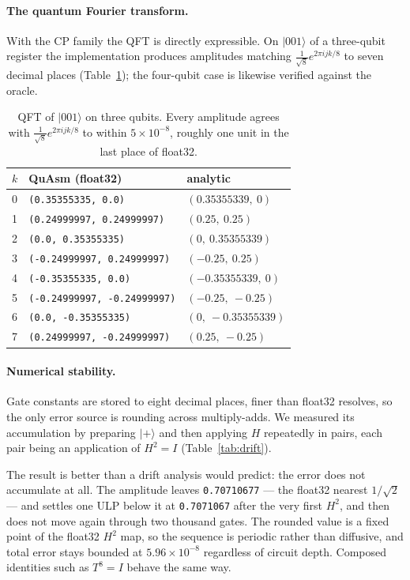 \documentclass[11pt]{article}
\newcommand{\quasm}{QuAsm}
\newcommand{\ket}[1]{\ensuremath{|#1\rangle}}
\begin{document}
\paragraph{The quantum Fourier transform.} With the $\mathrm{CP}$ family the QFT is directly
expressible. On $\ket{001}$ of a three-qubit register the implementation produces
amplitudes matching $\frac{1}{\sqrt{8}} e^{2\pi i jk/8}$ to seven decimal places
(Table~\ref{tab:qft}); the four-qubit case is likewise verified against the oracle.

\begin{table}[t]
\centering
\begin{tabular}{lll}
\toprule
$k$ & \quasm{} (float32) & analytic \\
\midrule
0 & \texttt{(0.35355335, 0.0)}          & $(0.35355339,\ 0)$ \\
1 & \texttt{(0.24999997, 0.24999997)}   & $(0.25,\ 0.25)$ \\
2 & \texttt{(0.0, 0.35355335)}          & $(0,\ 0.35355339)$ \\
3 & \texttt{(-0.24999997, 0.24999997)}  & $(-0.25,\ 0.25)$ \\
4 & \texttt{(-0.35355335, 0.0)}         & $(-0.35355339,\ 0)$ \\
5 & \texttt{(-0.24999997, -0.24999997)} & $(-0.25,\ -0.25)$ \\
6 & \texttt{(0.0, -0.35355335)}         & $(0,\ -0.35355339)$ \\
7 & \texttt{(0.24999997, -0.24999997)}  & $(0.25,\ -0.25)$ \\
\bottomrule
\end{tabular}
\caption{QFT of \ket{001} on three qubits. Every amplitude agrees with
$\frac{1}{\sqrt{8}}e^{2\pi ijk/8}$ to within $5\times10^{-8}$, roughly one unit in the last
place of float32.}
\label{tab:qft}
\end{table}

\paragraph{Numerical stability.} Gate constants are stored to eight decimal places, finer
than float32 resolves, so the only error source is rounding across multiply-adds. We
measured its accumulation by preparing \ket{+} and then applying $H$ repeatedly in pairs,
each pair being an application of $H^2 = I$ (Table~\ref{tab:drift}).

The result is better than a drift analysis would predict: the error does not accumulate at
all. The amplitude leaves \texttt{0.70710677} --- the float32 nearest $1/\sqrt2$ --- and
settles one ULP below it at \texttt{0.7071067} after the very first $H^2$, and then does not
move again through two thousand gates. The rounded value is a fixed point of the
float32 $H^2$ map, so the sequence is periodic rather than diffusive, and total error stays
bounded at $5.96 \times 10^{-8}$ regardless of circuit depth. Composed identities such as
$T^8 = I$ behave the same way.
\end{document}
